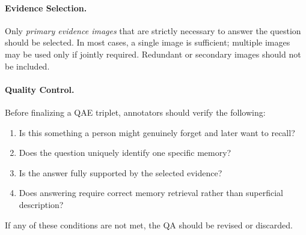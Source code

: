 \documentclass{article}
\theoremstyle{plain}
\theoremstyle{definition}
\theoremstyle{remark}
\begin{document}
\paragraph{Evidence Selection.}
Only \emph{primary evidence images} that are strictly necessary to answer the question should be selected.
In most cases, a single image is sufficient; multiple images may be used only if jointly required.
Redundant or secondary images should not be included.

\paragraph{Quality Control.}
Before finalizing a QAE triplet, annotators should verify the following:
\begin{enumerate}
    \item Is this something a person might genuinely forget and later want to recall?
    \item Does the question uniquely identify one specific memory?
    \item Is the answer fully supported by the selected evidence?
    \item Does answering require correct memory retrieval rather than superficial description?
\end{enumerate}
If any of these conditions are not met, the QA should be revised or discarded.

\end{document}
